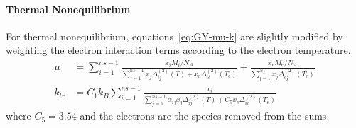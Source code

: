 \paragraph{Thermal Nonequilibrium}

For thermal nonequilibrium, equations~\eqref{eq:GY-mu-k} are slightly modified by weighting the electron interaction terms
according to the electron temperature. 
%
\begin{equation}
\begin{split}
\mu &= \sum_{i=1}^{ns-1}\frac{x_i M_i/N_A}{\sum_{j=1}^{ns-1}x_j \Delta_{ij}^{(2)}(T) + x_e \Delta_{ie}^{(2)}(T_e)}
+ \frac{x_e M_e/N_A}{\sum_{j=1}^{N_s} x_j \Delta_{ej}^{(2)}(T_e)} \\
k_{tr} &= C_1 k_B \sum_{i=1}^{ns-1} \frac{x_i}{\sum_{j=1}^{ns-1} \alpha_{ij} x_j \Delta_{ij}^{(2)}(T) + 
C_5 x_e \Delta_{ie}^{(2)}(T_e)}
\end{split}
\end{equation}
%
where $C_5 = 3.54$ and the electrons are the species removed from the sums.


